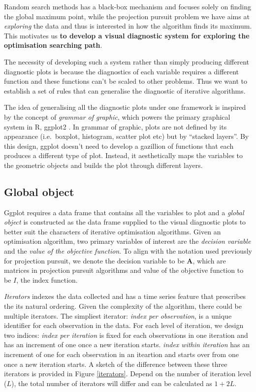 \documentclass[12pt]{article}
\begin{document}
Random search methods has a black-box mechanism and focuses solely on
finding the global maximum point, while the projection pursuit problem
we have aims at \emph{exploring} the data and thus is interested in how
the algorithm finds its maximum. This motivates us \textbf{to develop a
visual diagnostic system for exploring the optimisation searching path}.

The necessity of developing such a system rather than simply producing
different diagnostic plots is because the diagnostics of each variable
requires a different function and these functions can't be scaled to
other problems. Thus we want to establish a set of rules that can
generalise the diagnostic of iterative algorithms.

The idea of generalising all the diagnostic plots under one framework is
inspired by the concept of \emph{grammar of
graphic}\citep{wickham2010layered}, which powers the primary graphical
system in R, ggplot2 \citep{ggplot2}. In grammar of graphic, plots are
not defined by its appearance (i.e.~boxplot, histogram, scatter plot
etc) but by ``stacked layers''. By this design, ggplot doesn't need to
develop a gazillion of functions that each produces a different type of
plot. Instead, it aesthetically maps the variables to the geometric
objects and builds the plot through different layers.

\hypertarget{global-object}{%
\subsection{Global object}\label{global-object}}

Ggplot requires a data frame that contains all the variables to plot and
a \emph{global object} is constructed as the data frame supplied to the
visual diagnostic plots to better suit the characters of iterative
optimisation algorithms. Given an optimisation algorithm, two primary
variables of interest are the \emph{decision variable} and the
\emph{value of the objective function}. To align with the notation used
previously for projection pursuit, we denote the decision variable to be
\(\mathbf{A}\), which are matrices in projection pursuit algorithms and
value of the objective function to be \(I\), the index function.

\emph{Iterators} indexes the data collected and has a time series
feature that prescribes the its natural ordering. Given the complexity
of the algorithm, there could be multiple iterators. The simpliest
iterator: \emph{index per observation}, is a unique identifier for each
observation in the data. For each level of iteration, we design two
indices: \emph{index per iteration} is fixed for each observations in
one iteration and has an increment of one once a new iteration starts.
\emph{index within iteration} has an increment of one for each
observation in an iteartion and starts over from one once a new
iteration starts. A sketch of the difference between these three
iterators is provided in Figure \ref{iterators}. Depend on the number of
iteration level (\(L\)), the total number of iterators will differ and
can be calculated as \(1 + 2L\).
\end{document}
